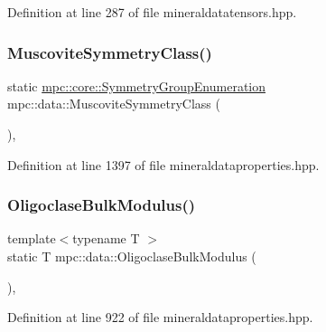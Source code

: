 Definition at line 287 of file mineraldatatensors.\+hpp.

\mbox{\label{namespacempc_1_1data_a4eca1734b2c5e996daf9e48a3dc73126}} 
\subsubsection{\texorpdfstring{Muscovite\+Symmetry\+Class()}{MuscoviteSymmetryClass()}}
{\footnotesize\ttfamily static \mbox{\hyperlink{namespacempc_1_1core_a9d979684062547055a0ef5c13077bad8}{mpc\+::core\+::\+Symmetry\+Group\+Enumeration}} mpc\+::data\+::\+Muscovite\+Symmetry\+Class (\begin{DoxyParamCaption}{ }\end{DoxyParamCaption})\hspace{0.3cm}{\ttfamily [inline]}, {\ttfamily [static]}}



Definition at line 1397 of file mineraldataproperties.\+hpp.

\mbox{\label{namespacempc_1_1data_a3147a663120c06f34316ad1df85adb1d}} 
\subsubsection{\texorpdfstring{Oligoclase\+Bulk\+Modulus()}{OligoclaseBulkModulus()}}
{\footnotesize\ttfamily template$<$typename T $>$ \\
static T mpc\+::data\+::\+Oligoclase\+Bulk\+Modulus (\begin{DoxyParamCaption}{ }\end{DoxyParamCaption})\hspace{0.3cm}{\ttfamily [inline]}, {\ttfamily [static]}}



Definition at line 922 of file mineraldataproperties.\+hpp.

\mbox{\label{namespacempc_1_1data_adb6a90263167f5afdd52570544c1b6b9}} 
